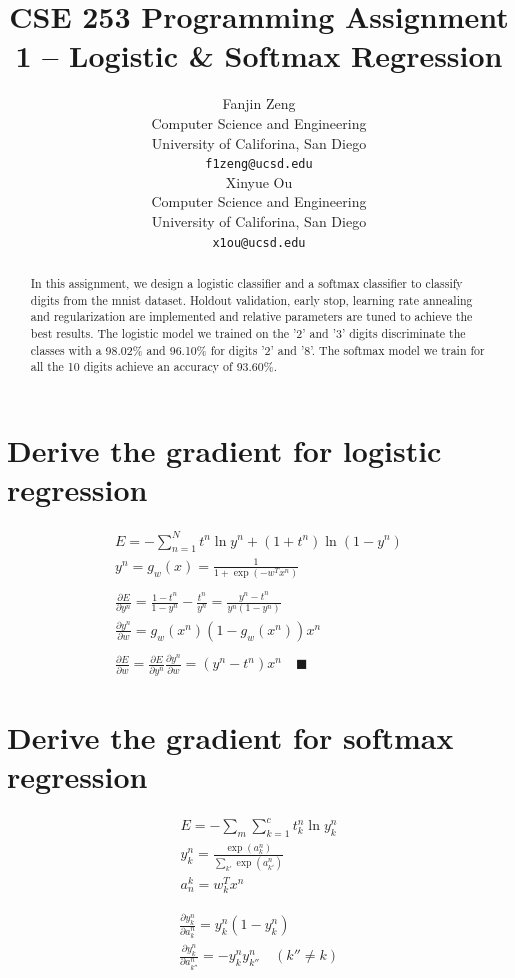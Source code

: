 \documentclass{article}
\title{CSE 253 Programming Assignment 1 -- Logistic \& Softmax Regression}
\author{
  Fanjin Zeng \\
  Computer Science and Engineering\\
  University of Califorina, San Diego\\
  \texttt{f1zeng@ucsd.edu} \\
   \And
   Xinyue Ou \\
   Computer Science and Engineering\\
   University of Califorina, San Diego \\
   \texttt{x1ou@ucsd.edu} \\
}
\begin{document}
\maketitle
\begin{abstract}
	In this assignment, we design a logistic classifier and a softmax classifier to classify digits from the mnist dataset. Holdout validation, early stop, learning rate annealing and regularization are implemented and relative parameters are tuned to achieve the best results. The logistic model we trained on the '2' and '3' digits discriminate the classes with a 98.02\% and  96.10\% for digits '2' and '8'. The softmax model we train for all the 10 digits achieve an accuracy of 93.60\%.
\end{abstract}
\section{Derive the gradient for logistic regression}
\begin{equation*}
\begin{gathered}
	E = - \sum_{n=1}^{N}{t^n\ln y^n + (1+t^n) \ln (1-y^n)} \\
	y^n = g_w(x) = \frac{1}{1 + \exp(-w^Tx^n)}\\
	\\
	\frac{\partial E}{\partial y^n} = \frac{1-t^n}{1-y^n}- \frac{t^n}{y^n} = \frac{y^n - t^n}{y^n(1-y^n)}\\
	\frac{\partial y^n}{\partial w} = g_w(x^n) (1-g_w(x^n)) x^n\\
	\\
	\frac{\partial E}{\partial w} = \frac{\partial E}{\partial y^n} \frac{\partial y^n}{\partial w} = (y^n - t^n) x^n	\quad\blacksquare
\end{gathered}
\end{equation*}


\section{Derive the gradient for softmax regression}
\begin{equation*}
\begin{gathered}
	E = - \sum_m \sum_{k=1}^{c} t_k^n \ln y_k^n \\
	y_k^n = \frac{\exp (a_k^n)}{\sum_{k'} \exp(a_{k'}^n)} \\
	a_n^k = w_k^T x^n
\end{gathered}
\end{equation*}

\begin{equation*}
\begin{gathered}
	\frac{\partial y_k^n}{\partial a_k^n} = y_k^n (1 - y_k^n) \\
	\frac{\partial y_k^n}{\partial a_{k''}^n} = - y_k^n y_{k''}^n \quad (k'' \ne k) 
\end{gathered}
\end{equation*}
\end{document}
